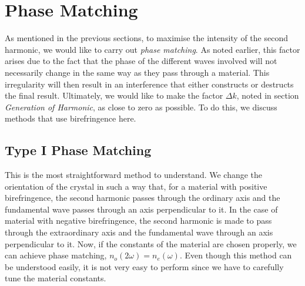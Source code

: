 \section{Phase Matching}
As mentioned in the previous sections, to maximise the intensity of the second harmonic, we would like to carry out \textit{phase matching}. As noted earlier, this factor arises due to the fact that the phase of the different waves involved will not necessarily change in the same way as they pass through a material. This irregularity will then result in an interference that either constructs or destructs the final result. Ultimately, we would like to make the factor $\Delta k$, noted in section \textit{Generation of Harmonic}, as close to zero as possible. To do this, we discuss methods that use birefringence here.

\subsection{Type I Phase Matching}
This is the most straightforward method to understand. We change the orientation of the crystal in such a way that, for a material with positive birefringence, the second harmonic passes through the ordinary axis and the fundamental wave passes through an axis perpendicular to it. In the case of material with negative birefringence, the second harmonic is made to pass through the extraordinary axis and the fundamental wave through an axis perpendicular to it. Now, if the constants of the material are chosen properly, we can achieve phase matching, $n_o (2\omega) = n_e (\omega)$. Even though this method can be understood easily, it is not very easy to perform since we have to carefully tune the material constants.

